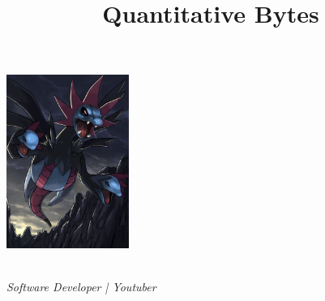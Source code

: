 \documentclass[11pt,oneside,a4paper,titlepage]{article}
\title{Quantitative Bytes}
\date{}
\begin{document}
	
\begin{tcolorbox}
	\begin{minipage}{4.5cm}
	\hspace*{-0.3cm}\includegraphics[width=4cm]{dp.jpeg}
	\end{minipage}	
	\begin{minipage}{15cm}
		\begin{center}
			{\Huge \sffamily \scshape \textcolor{white}{Quantitative Bytes}}\\
			\vspace*{0.5cm}
			{\Large \color{white} \em Software Developer | Youtuber}
		\end{center}
	\end{minipage}
\end{tcolorbox}
\end{document}
